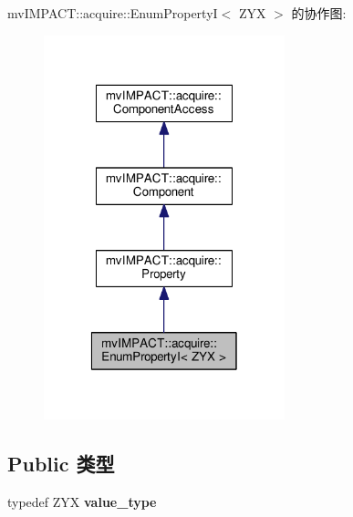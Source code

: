 mv\+I\+M\+P\+A\+C\+T\+:\+:acquire\+:\+:Enum\+Property\+I$<$ Z\+Y\+X $>$ 的协作图\+:
\nopagebreak
\begin{figure}[H]
\begin{center}
\leavevmode
\includegraphics[width=198pt]{classmv_i_m_p_a_c_t_1_1acquire_1_1_enum_property_i__coll__graph}
\end{center}
\end{figure}
\subsection*{Public 类型}
\begin{DoxyCompactItemize}
\item 
\hypertarget{classmv_i_m_p_a_c_t_1_1acquire_1_1_enum_property_i_ad5b483783765b640b0573ec7edd41098}{typedef Z\+Y\+X {\bfseries value\+\_\+type}}\label{classmv_i_m_p_a_c_t_1_1acquire_1_1_enum_property_i_ad5b483783765b640b0573ec7edd41098}

\end{DoxyCompactItemize}
